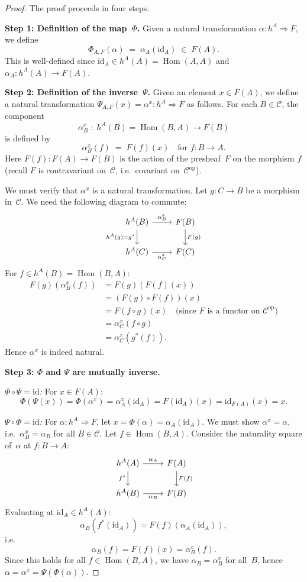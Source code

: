 \documentclass[a4paper,12pt]{book}
\DeclareMathOperator{\Hom}{Hom}
\newcommand{\op}{\mathrm{op}}
\newcommand{\id}{\mathrm{id}}
\theoremstyle{definition}
\theoremstyle{plain}
\theoremstyle{remark}
\begin{document}
\begin{proof}
The proof proceeds in four steps.

\medskip\noindent
\textbf{Step 1: Definition of the map~$\Phi$.}
Given a natural transformation $\alpha\colon h^A\Rightarrow F$,
we define
\[
    \Phi_{A,F}(\alpha) \;=\; \alpha_A(\id_A) \;\in\; F(A).
\]
This is well-defined since $\id_A\in h^A(A) = \Hom(A,A)$
and $\alpha_A\colon h^A(A)\to F(A)$.

\medskip\noindent
\textbf{Step 2: Definition of the inverse~$\Psi$.}
Given an element $x\in F(A)$, we define a natural transformation
$\Psi_{A,F}(x) = \alpha^x\colon h^A\Rightarrow F$ as follows.
For each $B\in\mathcal{C}$, the component
\[
    \alpha^x_B \;\colon\; h^A(B) = \Hom(B,A) \longrightarrow F(B)
\]
is defined by
\[
    \alpha^x_B(f) \;=\; F(f)(x) \quad\text{for } f\colon B\to A.
\]
Here $F(f)\colon F(A)\to F(B)$ is the action of the presheaf~$F$ on
the morphism $f$ (recall $F$ is contravariant on~$\mathcal{C}$, i.e.\
covariant on~$\mathcal{C}^{\op}$).

We must verify that $\alpha^x$ is a natural transformation.  Let
$g\colon C\to B$ be a morphism in~$\mathcal{C}$.  We need the following
diagram to commute:
\[
\begin{tikzcd}
h^A(B) \arrow[r, "\alpha^x_B"] \arrow[d, "h^A(g) = g^*"'] &
F(B) \arrow[d, "F(g)"] \\
h^A(C) \arrow[r, "\alpha^x_C"'] &
F(C)
\end{tikzcd}
\]
For $f\in h^A(B) = \Hom(B,A)$:
\begin{align*}
    F(g)(\alpha^x_B(f))
    &= F(g)(F(f)(x)) \\
    &= (F(g)\circ F(f))(x) \\
    &= F(f\circ g)(x) \quad\text{(since $F$ is a functor on $\mathcal{C}^{\op}$)}\\
    &= \alpha^x_C(f\circ g) \\
    &= \alpha^x_C(g^*(f)).
\end{align*}
Hence $\alpha^x$ is indeed natural.

\medskip\noindent
\textbf{Step 3: $\Phi$ and $\Psi$ are mutually inverse.}

\emph{$\Phi\circ\Psi = \id$:}
For $x\in F(A)$:
\[
    \Phi(\Psi(x)) = \Phi(\alpha^x) = \alpha^x_A(\id_A)
    = F(\id_A)(x) = \id_{F(A)}(x) = x.
\]

\emph{$\Psi\circ\Phi = \id$:}
For $\alpha\colon h^A\Rightarrow F$, let $x = \Phi(\alpha) = \alpha_A(\id_A)$.
We must show $\alpha^x = \alpha$, i.e.\ $\alpha^x_B = \alpha_B$ for
all $B\in\mathcal{C}$.  Let $f\in\Hom(B,A)$.  Consider the naturality
square of~$\alpha$ at $f\colon B\to A$:
\[
\begin{tikzcd}
h^A(A) \arrow[r, "\alpha_A"] \arrow[d, "f^*"'] &
F(A) \arrow[d, "F(f)"] \\
h^A(B) \arrow[r, "\alpha_B"'] &
F(B)
\end{tikzcd}
\]
Evaluating at $\id_A \in h^A(A)$:
\[
    \alpha_B(f^*(\id_A)) = F(f)(\alpha_A(\id_A)),
\]
i.e.\
\[
    \alpha_B(f) = F(f)(x) = \alpha^x_B(f).
\]
Since this holds for all $f\in\Hom(B,A)$, we have $\alpha_B = \alpha^x_B$
for all~$B$, hence $\alpha = \alpha^x = \Psi(\Phi(\alpha))$.


\end{proof}
\end{document}
